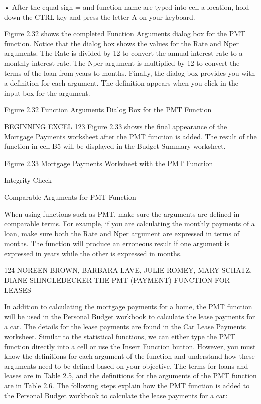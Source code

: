 • After the equal sign = and function name are typed into cell a location, hold down the CTRL key and press
the letter A on your keyboard.



Figure 2.32 shows the completed Function Arguments dialog box for the PMT function. Notice that
the dialog box shows the values for the Rate and Nper arguments. The Rate is divided by 12 to convert
the annual interest rate to a monthly interest rate. The Nper argument is multiplied by 12 to convert
the terms of the loan from years to months. Finally, the dialog box provides you with a definition for
each argument. The definition appears when you click in the input box for the argument.




Figure 2.32 Function Arguments Dialog Box for the PMT Function




BEGINNING EXCEL 123
Figure 2.33 shows the final appearance of the Mortgage Payments worksheet after the PMT function
is added. The result of the function in cell B5 will be displayed in the Budget Summary worksheet.




Figure 2.33 Mortgage Payments Worksheet with the PMT Function




Integrity Check

Comparable Arguments for PMT Function

When using functions such as PMT, make sure the arguments are defined in comparable terms. For example, if you
are calculating the monthly payments of a loan, make sure both the Rate and Nper argument are expressed in terms
of months. The function will produce an erroneous result if one argument is expressed in years while the other is
expressed in months.




124 NOREEN BROWN, BARBARA LAVE, JULIE ROMEY, MARY SCHATZ, DIANE SHINGLEDECKER
THE PMT (PAYMENT) FUNCTION FOR LEASES

In addition to calculating the mortgage payments for a home, the PMT function will be used in the
Personal Budget workbook to calculate the lease payments for a car. The details for the lease payments
are found in the Car Lease Payments worksheet. Similar to the statistical functions, we can either
type the PMT function directly into a cell or use the Insert Function button. However, you must know
the definitions for each argument of the function and understand how these arguments need to be
defined based on your objective. The terms for loans and leases are in Table 2.5, and the definitions
for the arguments of the PMT function are in Table 2.6. The following steps explain how the PMT
function is added to the Personal Budget workbook to calculate the lease payments for a car:


